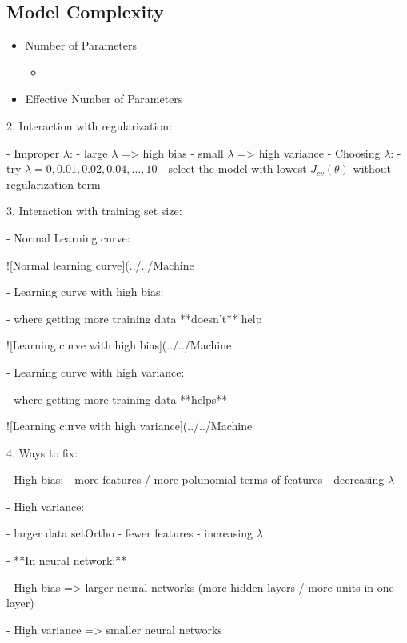 \subsection{Model Complexity}
\begin{itemize}
\item Number of Parameters
	\begin{itemize}
	\item 
	\end{itemize}
\item Effective Number of Parameters
	
\end{itemize}

2. Interaction with regularization:

- Improper $\lambda$:
- large $\lambda$ => high bias
- small $\lambda$ => high variance
- Choosing $\lambda$:
- try $\lambda=0,0.01,0.02,0.04,...,10$
- select the model with lowest $J_{cv}(\theta)$ without regularization term

3. Interaction with training set size:

- Normal Learning curve:

![Normal learning curve](../../Machine%

- Learning curve with high bias:

- where getting more training data **doesn't** help

![Learning curve with high bias](../../Machine%

- Learning curve with high variance:

- where getting more training data **helps**

![Learning curve with high variance](../../Machine%

4. Ways to fix:

- High bias:
- more features / more polunomial terms of features
- decreasing $\lambda$

- High variance:

- larger data setOrtho
- fewer features
- increasing $\lambda$

- **In neural network:**

- High bias => larger neural networks (more hidden layers / more units in one layer)

- High variance => smaller neural networks

